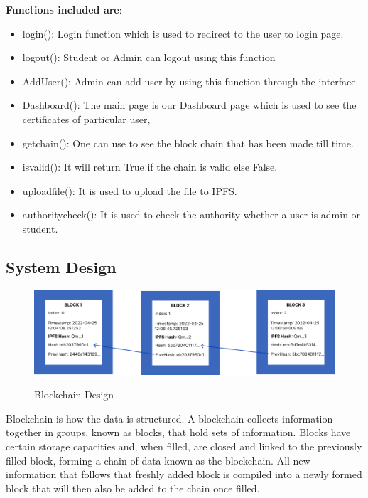 \textbf{Functions included are}:
\begin{itemize}
    \item login(): Login function which is used to redirect to the user to login page.
    \item logout(): Student or Admin can logout using this function
    \item AddUser(): Admin can add user by using this function through the interface.
    \item Dashboard(): The main page is our Dashboard page which is used to see the certificates of particular user,
    \item getchain(): One can use to see the block chain that has been made till time.
    \item isvalid(): It will return True if the chain is valid else False.
    \item uploadfile(): It is used to upload the file to IPFS.
    \item authoritycheck(): It is used to check the authority whether a user is admin or student.
\end{itemize}

\subsection{System Design} 
\begin{figure}[H]
    \centering
    \includegraphics[scale=0.4]{images/ipfs_blockchain.png}\\[0.5cm]
    \caption{Blockchain Design}
    \label{fig:my_label}
\end{figure}

Blockchain is how the data is structured. A blockchain collects information together in groups, known as blocks, that hold sets of information. Blocks have certain storage capacities and, when filled, are closed and linked to the previously filled block, forming a chain of data known as the blockchain. All new information that follows that freshly added block is compiled into a newly formed block that will then also be added to the chain once filled.

